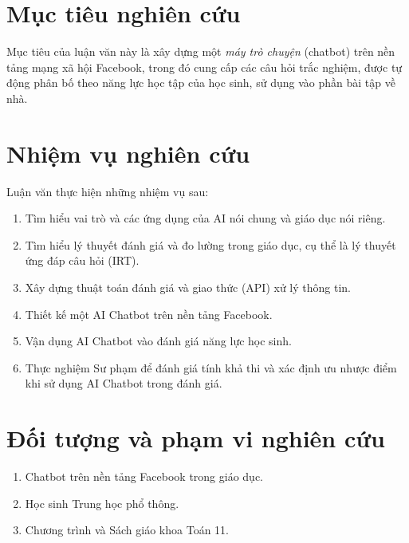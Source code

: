 \section{Mục tiêu nghiên cứu}
Mục tiêu của luận văn này là xây dựng một \textit{máy trò chuyện} (chatbot) trên nền tảng mạng xã hội Facebook, trong đó cung cấp các câu hỏi trắc nghiệm, được tự động phân bố theo năng lực học tập của học sinh, sử dụng vào phần bài tập về nhà.
\newpage
\section{Nhiệm vụ nghiên cứu}
Luận văn thực hiện những nhiệm vụ sau:\par
\begin{enumerate}[label=\textbf{(\arabic*)},align=left,left=1cm..0cm,itemindent=*]
	\item Tìm hiểu vai trò và các ứng dụng của AI nói chung và giáo dục nói riêng.
	\item Tìm hiểu lý thuyết đánh giá và đo lường trong giáo dục, cụ thể là lý thuyết ứng đáp câu hỏi (IRT).
	\item Xây dựng thuật toán đánh giá và giao thức (API) xử lý thông tin.
	\item Thiết kế một AI Chatbot trên nền tảng Facebook.
	\item Vận dụng AI Chatbot vào đánh giá năng lực học sinh.
	\item Thực nghiệm Sư phạm để đánh giá tính khả thi và xác định ưu nhược điểm khi sử dụng AI Chatbot trong đánh giá.
\end{enumerate}\par

\section{Đối tượng và phạm vi nghiên cứu}
\begin{enumerate}[label=\textbf{(\arabic*)},align=left,left=1cm..0cm,itemindent=*]
	\item Chatbot trên nền tảng Facebook trong giáo dục.
	\item Học sinh Trung học phổ thông.
	\item Chương trình và Sách giáo khoa Toán 11.
\end{enumerate}

